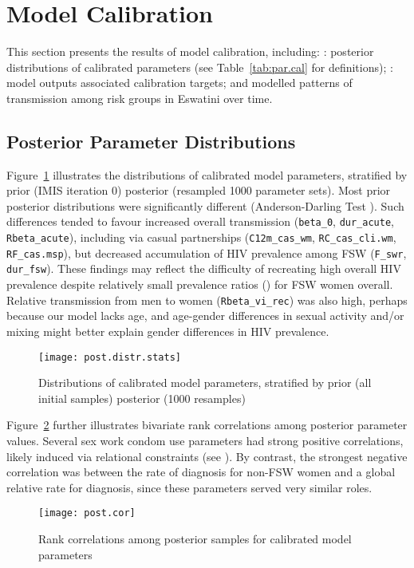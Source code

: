 \section{Model Calibration}\label{sr.cal}
This section presents the results of model calibration, including:
: posterior distributions of calibrated parameters
(see Table~\ref{tab:par.cal} for definitions);
: model outputs \vs associated calibration targets; and
 modelled patterns of transmission among risk groups in Eswatini over time.
\subsection{Posterior Parameter Distributions}\label{sr.cal.par}
Figure~\ref{fig:post.distr} illustrates the distributions of calibrated model parameters,
stratified by prior (IMIS iteration 0) \vs posterior (resampled 1000 parameter sets).
Most prior \vs posterior distributions were significantly different
(Anderson-Darling Test \cite{Scholz1987}).
Such differences tended to favour increased overall transmission
(\eg \texttt{beta_0}, \texttt{dur_acute}, \texttt{Rbeta_acute}),
including via casual partnerships
(\eg \texttt{C12m_cas_wm}, \texttt{RC_cas_cli.wm}, \texttt{RF_cas.msp}),
but decreased accumulation of HIV prevalence among FSW
(\eg \texttt{F_swr}, \texttt{dur_fsw}).
These findings may reflect the difficulty of recreating high overall HIV prevalence
despite relatively small prevalence ratios () for FSW \vs women overall.
Relative transmission from men to women (\texttt{Rbeta_vi_rec}) was also high,
perhaps because our model lacks age, and
age-gender differences in sexual activity and/or mixing might better explain
gender differences in HIV prevalence.
\begin{figure}
  \centering\texttt{[image: post.distr.stats]}
  \caption{Distributions of calibrated model parameters,
    stratified by prior (all initial samples) \vs posterior (1000 resamples)}
  \label{fig:post.distr}
\end{figure}
\par
Figure~\ref{fig:post.cor} further illustrates
bivariate rank correlations among posterior parameter values.
Several sex work condom use parameters had strong positive correlations,
likely induced via relational constraints (see ).
By contrast, the strongest negative correlation was between
the rate of diagnosis for non-FSW women and a global relative rate for diagnosis,
since these parameters served very similar roles.
\begin{figure}
  \centering\texttt{[image: post.cor]}
  \caption{Rank correlations among posterior samples for calibrated model parameters}
  \label{fig:post.cor}
\end{figure}
